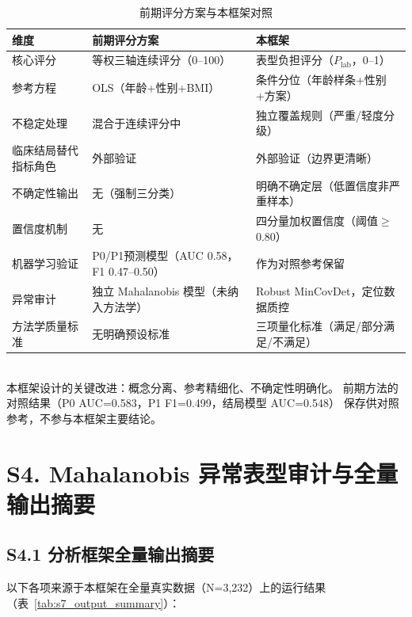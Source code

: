 \documentclass[12pt, a4paper]{ctexart}
\begin{document}
\begin{table}[htbp]
\centering
\small
\caption{前期评分方案与本框架对照}
\label{tab:s6_legacy_compare}
\begin{tabular}{lll}
\toprule
维度 & 前期评分方案 & 本框架 \\
\midrule
核心评分 & 等权三轴连续评分（0--100） & 表型负担评分（$P_{\text{lab}}$，0--1） \\
参考方程 & OLS（年龄+性别+BMI） & 条件分位（年龄样条+性别+方案） \\
不稳定处理 & 混合于连续评分中 & 独立覆盖规则（严重/轻度分级） \\
临床结局替代指标角色 & 外部验证 & 外部验证（边界更清晰） \\
不确定性输出 & 无（强制三分类）& 明确不确定层（低置信度非严重样本）\\
置信度机制 & 无 & 四分量加权置信度（阈值$\geq$0.80）\\
机器学习验证 & P0/P1预测模型（AUC 0.58，F1 0.47--0.50）& 作为对照参考保留 \\
异常审计 & 独立 Mahalanobis 模型（未纳入方法学） & Robust MinCovDet，定位数据质控 \\
方法学质量标准 & 无明确预设标准 & 三项量化标准（满足/部分满足/不满足）\\
\bottomrule
\end{tabular}
\\[1ex]
{\footnotesize 本框架设计的关键改进：概念分离、参考精细化、不确定性明确化。
前期方法的对照结果（P0 AUC=0.583，P1 F1=0.499，结局模型 AUC=0.548）
保存供对照参考，不参与本框架主要结论。}
\end{table}

\section*{S4. Mahalanobis 异常表型审计与全量输出摘要}

\subsection*{S4.1 分析框架全量输出摘要}

以下各项来源于本框架在全量真实数据（N=3,232）上的运行结果
（表~\ref{tab:s7_output_summary}）：
\end{document}
